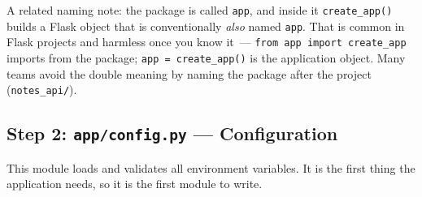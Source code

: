 \noindent{}A related naming note: the package is called \texttt{app}, and inside it \texttt{create\_app()} builds a Flask object that is conventionally \emph{also} named \texttt{app}. That is common in Flask projects and harmless once you know it~--- \texttt{from\ app\ import\ create\_}\allowbreak{}\texttt{app} imports from the package; \texttt{app\ =}\allowbreak{}\texttt{\ create\_app()} is the application object. Many teams avoid the double meaning by naming the package after the project (\texttt{notes\_api/}).

\subsection*{\texorpdfstring{Step 2: \texttt{app/config.py} --- Configuration}{Step 2: app/config.py --- Configuration}}\label{15-structuring-the-application:step-2-appconfigpy--configuration}

This module loads and validates all environment variables. It is the first thing the application needs, so it is the first module to write.


